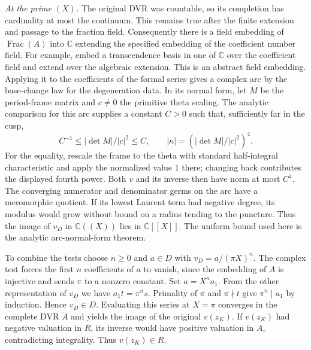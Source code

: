 \emph{At the prime \((X)\).}
The original DVR was countable, so its completion has cardinality
at most the continuum. This remains true after the finite
extension and passage to the fraction field. Consequently there
is a field embedding of \(\operatorname{Frac}(A)\) into \(\mathbb C\)
extending the specified embedding of the coefficient number field.
For example, embed a transcendence basis in one of \(\mathbb C\)
over the coefficient field and extend over the algebraic extension.
This is an abstract field embedding. Applying it to the coefficients
of the formal series gives a complex arc by the base-change law for
the degeneration data. In its normal form, let \(M\) be the
period-frame matrix and \(c\ne0\) the primitive theta scaling.
The analytic comparison for this arc supplies a constant \(C>0\)
such that, sufficiently far in the cusp,
\[
 C^{-1}\leq |\det M|/|c|^2\leq C,\qquad
 |\kappa|=(|\det M|/|c|^2)^4 .
\]
For the equality, rescale the frame to the theta with standard
half-integral characteristic and apply the normalized value \(1\)
there; changing back contributes the displayed fourth power.
Both \(v\) and its inverse then have norm at most \(C^4\).
The converging numerator and denominator germs on the arc have
a meromorphic quotient. If its lowest Laurent term had negative
degree, its modulus would grow without bound on a radius tending
to the puncture. Thus the image of \(v_D\) in
\(\mathbb C((X))\) lies in \(\mathbb C[[X]]\).
The uniform bound used here is the analytic arc-normal-form theorem.

To combine the tests choose \(n\geq0\) and \(a\in D\) with
\(v_D=a/(\pi X)^n\). The complex test forces the first \(n\)
coefficients of \(a\) to vanish, since the embedding of \(A\)
is injective and sends \(\pi\) to a nonzero constant. Set
\(a=X^n a_1\). From the other representation of \(v_D\) we have
\(a_1 t=\pi^n s\). Primality of \(\pi\) and \(\pi\nmid t\)
give \(\pi^n\mid a_1\) by induction. Hence \(v_D\in D\).
Evaluating this series at \(X=\pi\) converges in the complete DVR
\(A\) and yields the image of the original \(v(z_K)\).
If \(v(z_K)\) had negative valuation in \(R\), its inverse would
have positive valuation in \(A\), contradicting integrality.
Thus \(v(z_K)\in R\).


